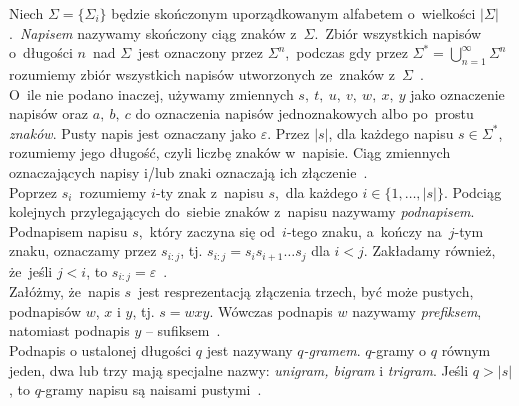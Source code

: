 \documentclass{praca1}
\begin{document}
\begin{definition}
Niech  $\Sigma = \{\Sigma_i\}$ będzie skończonym uporządkowanym alfabetem o~wielkości $|\Sigma|$.~\emph{Napisem} nazywamy skończony ciąg znaków z~$\Sigma$.~Zbiór wszystkich napisów o~długości $n$~nad $\Sigma$~jest oznaczony przez $\Sigma^n$,~podczas gdy przez $\Sigma^* = \bigcup_{n=1}^{\infty}\Sigma^n$ rozumiemy zbiór wszystkich napisów utworzonych ze~znaków z~$\Sigma$~\cite{Boytsov2011:indexingmethods}.\\

O~ile nie podano inaczej, używamy zmiennych $s,\ t,\ u,\ v,\ w,\ x,\ y$ jako oznaczenie napisów oraz $a,\ b,\ c$ do oznaczenia napisów jednoznakowych albo po~prostu \emph{znaków}. Pusty napis jest oznaczany jako $\varepsilon$. Przez $|s|$, dla każdego napisu $s \in \Sigma^*$, rozumiemy jego długość, czyli liczbę znaków w~napisie. Ciąg zmiennych oznaczających napisy i/lub znaki oznaczają ich złączenie~\cite{Boytsov2011:indexingmethods}.\\

Poprzez $s_i$~rozumiemy $i$-ty znak z~napisu $s$,~dla każdego $i \in \{1,\ldots,|s|\}$. Podciąg kolejnych przylegających do~siebie znaków z~napisu nazywamy \emph{podnapisem}. Podnapisem napisu $s$,~który zaczyna się od~$i$-tego znaku, a~kończy na~$j$-tym znaku, oznaczamy przez $s_{i:j}$, tj. $s_{i:j} = s_is_{i+1}\ldots s_j$ dla $i<j$. Zakładamy również, że~jeśli $j<i$, to $s_{i:j} = \varepsilon$~\cite{Boytsov2011:indexingmethods,Loo2014:stringdist}.\\

Załóżmy, że~napis $s$~jest resprezentacją złączenia trzech, być może pustych, podnapisów $w$, $x$ i $y$, tj. $s = wxy$. Wówczas podnapis $w$ nazywamy \emph{prefiksem}, natomiast podnapis $y$ -- sufiksem~\cite{Boytsov2011:indexingmethods}.\\

Podnapis o ustalonej długości $q$ jest nazywany \emph{$q$-gramem}. $q$-gramy o $q$ równym jeden, dwa lub trzy mają specjalne nazwy: \emph{unigram, bigram} i \emph{trigram}. Jeśli $q > |s|$, to $q$-gramy napisu są naisami pustymi~\cite{Boytsov2011:indexingmethods}.
\end{definition}

\end{document}
